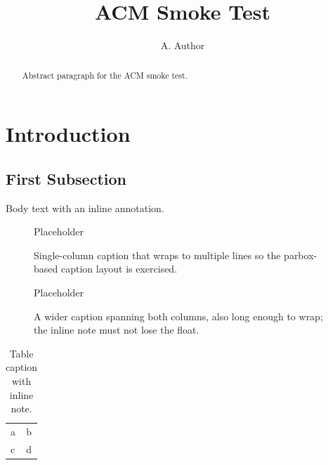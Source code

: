 \documentclass[sigconf,nonacm]{acmart}
\title{ACM Smoke Test\todo{acm title}}
\author{A. Author}
\affiliation{%
  \institution{University}
  \city{City}
  \country{Country}}
\begin{document}
\begin{abstract}
 Abstract paragraph for the ACM smoke test. \lipsum[1][1-3]
\end{abstract}

\maketitle

\section{Introduction}
\subsection{First Subsection}
Body text with  an inline annotation. \lipsum[1]

\begin{figure}[t]
  \centering Placeholder
  \caption{Single-column caption that wraps to multiple lines so the
    parbox-based caption layout is exercised.}
  \label{fig:acm}
\end{figure}

\begin{figure}[t]
  \centering Placeholder
  \caption{A wider caption spanning both columns, also long enough to
    wrap; the inline note must not lose the float.}
  \label{fig:acm-wide}
\end{figure}

\begin{table}[t]
  \centering
  \caption{Table caption with inline note.}
  \label{tab:acm}
  \begin{tabular}{ll}\hline a & b \\ c & d \\\hline\end{tabular}
\end{table}

\lipsum[2-3]
\end{document}

